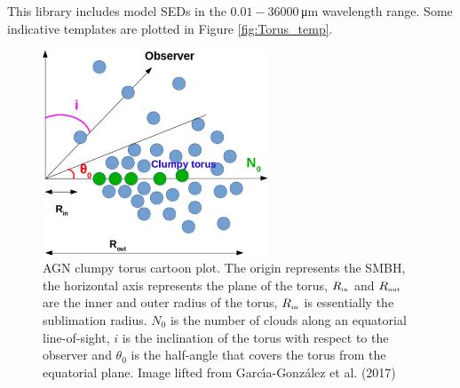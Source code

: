 This library includes model SEDs in the $0.01-36000 \,$μm wavelength range.
Some indicative templates are plotted in Figure \ref{fig:Torus_temp}.
\begin{figure}
\centering
  \includegraphics[width = 0.6\textwidth]{figures/TORUSparams_Cat3d.jpeg}
 \caption{AGN clumpy torus cartoon plot. The origin represents the SMBH, the horizontal axis represents the plane of the torus, $R_{\mbox{\tiny{in}}}$ and $R_{\mbox{\tiny{out}}}$ are the inner and outer radius of the torus, $R_{\mbox{\tiny{in}}}$ is essentially the sublimation radius. $N_0$ is the number of clouds along an equatorial line-of-sight, $i$ is the inclination of the torus with respect to the observer and $\theta_0$ is the half-angle that covers the torus from the equatorial plane. Image lifted from Garc{\'\i}a-Gonz{\'a}lez et al. (2017)\cite{GarciaGonzalez2017} }
  \label{fig:CAT3D}
\end{figure}
